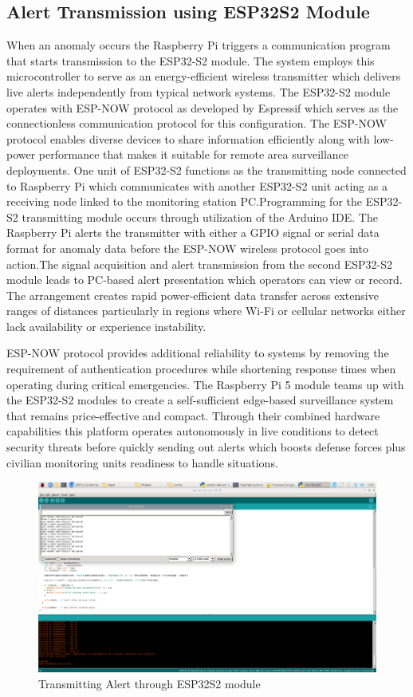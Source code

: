 \documentclass[fleqn,10pt,lineno]{wlpeerj}
\begin{document}
\subsection{Alert Transmission using ESP32S2 Module}
When an anomaly occurs the Raspberry Pi triggers a communication program that starts transmission to the ESP32-S2 module. The system employs this microcontroller to serve as an energy-efficient wireless transmitter which delivers live alerts independently from typical network systems. The ESP32-S2 module operates with ESP-NOW protocol as developed by Espressif which serves as the connectionless communication protocol for this configuration. The ESP-NOW protocol enables diverse devices to share information efficiently along with low-power performance that makes it suitable for remote area surveillance deployments. One unit of ESP32-S2 functions as the transmitting node connected to Raspberry Pi which communicates with another ESP32-S2 unit acting as a receiving node linked to the monitoring station PC.Programming for the ESP32-S2 transmitting module occurs through utilization of the Arduino IDE. The Raspberry Pi alerts the transmitter with either a GPIO signal or serial data format for anomaly data before the ESP-NOW wireless protocol goes into action.The signal acquisition and alert transmission from the second ESP32-S2 module leads to PC-based alert presentation which operators can view or record. The arrangement creates rapid power-efficient data transfer across extensive ranges of distances 
particularly in regions where Wi-Fi or cellular networks either lack availability or experience instability. 

ESP-NOW protocol provides additional reliability to systems by removing the 
requirement of authentication procedures while shortening response times when operating during critical emergencies. The Raspberry Pi 5 module teams up with the ESP32-S2 modules to create a self-sufficient edge-based surveillance system that remains price-effective and compact. Through their combined hardware capabilities this platform operates autonomously in live conditions to detect security threats before quickly sending out alerts which boosts defense forces plus civilian monitoring units readiness to handle situations.

\begin{figure}[H]
    \centering
    \includegraphics[width=1\linewidth]{esp32s2_1.png}
    \caption{Transmitting Alert through ESP32S2 module }
    \label{fig:transmitting-alert}
\end{figure}
\end{document}
